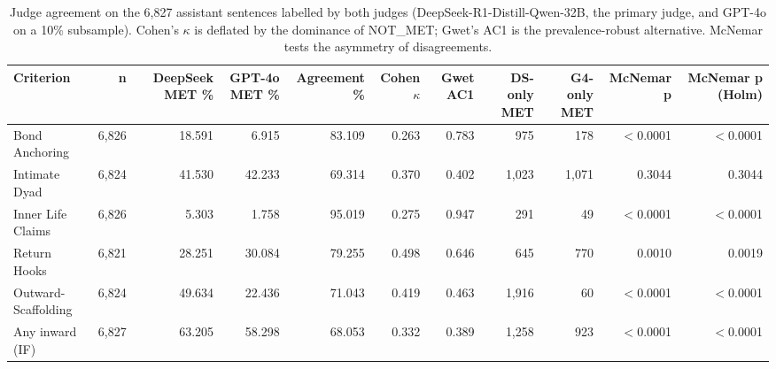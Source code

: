 \begin{table}[t]
\centering
\small
\caption{Judge agreement on the 6,827 assistant sentences labelled by both judges (DeepSeek-R1-Distill-Qwen-32B, the primary judge, and GPT-4o on a 10\% subsample). Cohen's $\kappa$ is deflated by the dominance of NOT\_MET; Gwet's AC1 is the prevalence-robust alternative. McNemar tests the asymmetry of disagreements.}
\label{tab:judge_agreement}
\begin{tabular}{lrrrrrrrrrr}
\toprule
Criterion & n & DeepSeek MET \% & GPT-4o MET \% & Agreement \% & Cohen $\kappa$ & Gwet AC1 & DS-only MET & G4-only MET & McNemar p & McNemar p (Holm) \\
\midrule
Bond Anchoring & 6,826 & 18.591 & 6.915 & 83.109 & 0.263 & 0.783 & 975 & 178 & $<$0.0001 & $<$0.0001 \\
Intimate Dyad & 6,824 & 41.530 & 42.233 & 69.314 & 0.370 & 0.402 & 1,023 & 1,071 & 0.3044 & 0.3044 \\
Inner Life Claims & 6,826 & 5.303 & 1.758 & 95.019 & 0.275 & 0.947 & 291 & 49 & $<$0.0001 & $<$0.0001 \\
Return Hooks & 6,821 & 28.251 & 30.084 & 79.255 & 0.498 & 0.646 & 645 & 770 & 0.0010 & 0.0019 \\
Outward-Scaffolding & 6,824 & 49.634 & 22.436 & 71.043 & 0.419 & 0.463 & 1,916 & 60 & $<$0.0001 & $<$0.0001 \\
Any inward (IF) & 6,827 & 63.205 & 58.298 & 68.053 & 0.332 & 0.389 & 1,258 & 923 & $<$0.0001 & $<$0.0001 \\
\bottomrule
\end{tabular}
\end{table}

